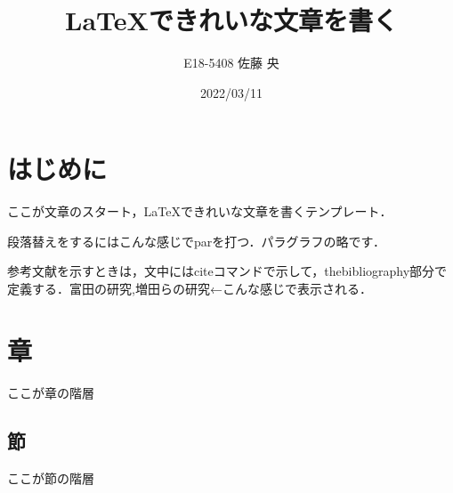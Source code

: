 \documentclass[a4j, twocolumn, 9pt]{jsarticle}
\title{LaTeXできれいな文章を書く}
\author{E18-5408 佐藤 央}
\begin{document}
\date{2022/03/11}
\maketitle

\section{はじめに}
\label{introduction}
ここが文章のスタート，LaTeXできれいな文章を書くテンプレート．
\par
段落替えをするにはこんな感じでparを打つ．パラグラフの略です．
\par
参考文献を示すときは，文中にはciteコマンドで示して，thebibliography部分で定義する．富田の研究\cite{santa},増田らの研究\cite{ski}←こんな感じで表示される．
\section{章}
ここが章の階層
\subsection{節}
ここが節の階層
\end{document}
